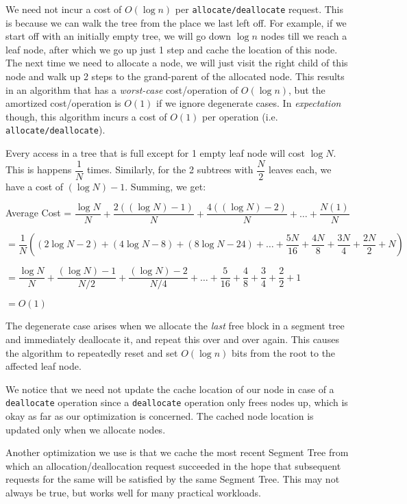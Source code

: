 \documentclass{article}
\begin{document}
We need not incur a cost of $O(\log{n})$ per
\texttt{allocate/deallocate} request. This is because we can walk the
tree from the place we last left off. For example, if we start off
with an initially empty tree, we will go down $\log{n}$ nodes till we
reach a leaf node, after which we go up just 1 step and cache the
location of this node. The next time we need to allocate a node, we
will just visit the right child of this node and walk up 2 steps to
the grand-parent of the allocated node. This results in an algorithm
that has a \textit{worst-case} cost/operation of $O(\log{n})$, but the
amortized cost/operation is $O(1)$ if we ignore degenerate cases. In
\textit{expectation} though, this algorithm incurs a cost of $O(1)$
per operation (i.e. \texttt{allocate/deallocate}).

Every access in a tree that is full except for 1 empty leaf node will
cost $\log{N}$. This is happens $\dfrac{1}{N}$ times. Similarly, for the 2
subtrees with $\dfrac{N}{2}$ leaves each, we have a cost of $(\log{N}) - 1$.
Summing, we get:

Average Cost = $\dfrac{\log{N}}{N} + \dfrac{2((\log{N}) - 1)}{N} + \dfrac{4((\log{N}) - 2)}{N} + \ldots{} + \dfrac{N(1)}{N}$

$= \dfrac{1}{N}\left((2 \log{N} - 2) + (4 \log{N} - 8) + (8 \log{N} - 24) + \ldots{} + \dfrac{5N}{16} + \dfrac{4N}{8} + \dfrac{3N}{4} + \dfrac{2N}{2} + N\right)$

$= \dfrac{\log{N}}{N} + \dfrac{(\log{N}) - 1}{N/2} + \dfrac{(\log{N}) - 2}{N/4} + \ldots{} + \dfrac{5}{16} + \dfrac{4}{8} + \dfrac{3}{4} + \dfrac{2}{2} + 1$

$= O(1)$

The degenerate case arises when we allocate the \textit{last} free
block in a segment tree and immediately deallocate it, and repeat this
over and over again. This causes the algorithm to repeatedly reset and
set $O(\log{n})$ bits from the root to the affected leaf node.

We notice that we need not update the cache location of our node in
case of a \texttt{deallocate} operation since a \texttt{deallocate}
operation only frees nodes up, which is okay as far as our
optimization is concerned. The cached node location is updated only
when we allocate nodes.

Another optimization we use is that we cache the most recent Segment
Tree from which an allocation/deallocation request succeeded in the
hope that subsequent requests for the same will be satisfied by the
same Segment Tree. This may not always be true, but works well for
many practical workloads.
\end{document}
